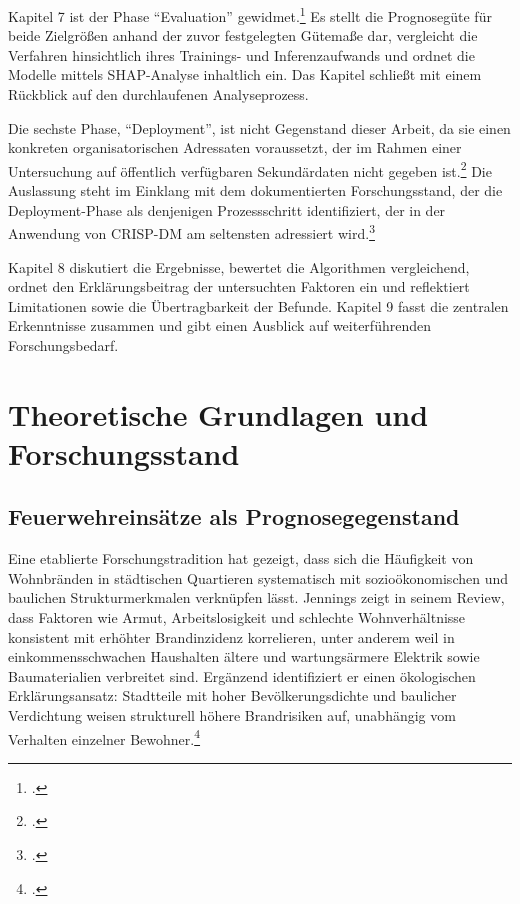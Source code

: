 \documentclass[12pt,a4paper]{article}
\begin{document}
Kapitel 7 ist der Phase \enquote{Evaluation} gewidmet.\footcite[6]{Marban2009} Es stellt die
Prognosegüte für beide Zielgrößen anhand der zuvor festgelegten Gütemaße dar, vergleicht die
Verfahren hinsichtlich ihres Trainings- und Inferenzaufwands und ordnet die Modelle mittels
SHAP-Analyse inhaltlich ein. Das Kapitel schließt mit einem Rückblick auf den durchlaufenen
Analyseprozess.

Die sechste Phase, \enquote{Deployment}, ist nicht Gegenstand dieser Arbeit, da sie einen
konkreten organisatorischen Adressaten voraussetzt, der im Rahmen einer Untersuchung auf
öffentlich verfügbaren Sekundärdaten nicht gegeben ist.\footcite[6]{Marban2009} Die Auslassung
steht im Einklang mit dem dokumentierten Forschungsstand, der die Deployment-Phase als denjenigen
Prozessschritt identifiziert, der in der Anwendung von CRISP-DM am seltensten adressiert
wird.\footcite[531--532]{Schroeer2021}

Kapitel 8 diskutiert die Ergebnisse, bewertet die Algorithmen vergleichend, ordnet den
Erklärungsbeitrag der untersuchten Faktoren ein und reflektiert Limitationen sowie die
Übertragbarkeit der Befunde. Kapitel 9 fasst die zentralen Erkenntnisse zusammen und gibt einen
Ausblick auf weiterführenden Forschungsbedarf.

\section{Theoretische Grundlagen und Forschungsstand}
\subsection{Feuerwehreinsätze als Prognosegegenstand}


Eine etablierte Forschungstradition hat gezeigt, dass sich die Häufigkeit von Wohnbränden in
städtischen Quartieren systematisch mit sozioökonomischen und baulichen Strukturmerkmalen
verknüpfen lässt. Jennings zeigt in seinem Review, dass Faktoren wie Armut, Arbeitslosigkeit und
schlechte Wohnverhältnisse konsistent mit erhöhter Brandinzidenz korrelieren, unter anderem weil
in einkommensschwachen Haushalten ältere und wartungsärmere Elektrik sowie Baumaterialien
verbreitet sind. Ergänzend identifiziert er einen ökologischen Erklärungsansatz: Stadtteile mit
hoher Bevölkerungsdichte und baulicher Verdichtung weisen strukturell höhere Brandrisiken auf,
unabhängig vom Verhalten einzelner Bewohner.\footcite[7-9]{Jennings1999}
\end{document}

